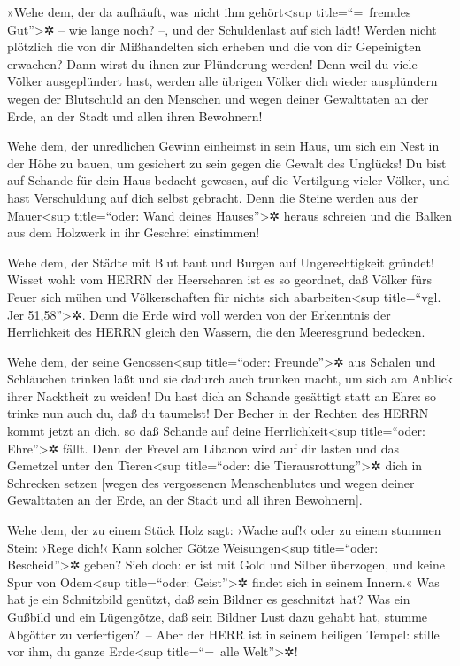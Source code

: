 »Wehe dem, der da aufhäuft, was nicht ihm gehört\textless sup
title=``=~fremdes Gut''\textgreater✲ -- wie lange noch? --, und der
Schuldenlast auf sich lädt!  Werden nicht plötzlich die
von dir Mißhandelten sich erheben und die von dir Gepeinigten erwachen?
Dann wirst du ihnen zur Plünderung werden!  Denn weil du
viele Völker ausgeplündert hast, werden alle übrigen Völker dich wieder
ausplündern wegen der Blutschuld an den Menschen und wegen deiner
Gewalttaten an der Erde, an der Stadt und allen ihren Bewohnern!

 Wehe dem, der unredlichen Gewinn einheimst in sein Haus,
um sich ein Nest in der Höhe zu bauen, um gesichert zu sein gegen die
Gewalt des Unglücks!  Du bist auf Schande für dein Haus
bedacht gewesen, auf die Vertilgung vieler Völker, und hast Verschuldung
auf dich selbst gebracht.  Denn die Steine werden aus der
Mauer\textless sup title=``oder: Wand deines Hauses''\textgreater✲
heraus schreien und die Balken aus dem Holzwerk in ihr Geschrei
einstimmen!

 Wehe dem, der Städte mit Blut baut und Burgen auf
Ungerechtigkeit gründet!  Wisset wohl: vom HERRN der
Heerscharen ist es so geordnet, daß Völker fürs Feuer sich mühen und
Völkerschaften für nichts sich abarbeiten\textless sup title=``vgl. Jer
51,58''\textgreater✲.  Denn die Erde wird voll werden von
der Erkenntnis der Herrlichkeit des HERRN gleich den Wassern, die den
Meeresgrund bedecken.

 Wehe dem, der seine Genossen\textless sup title=``oder:
Freunde''\textgreater✲ aus Schalen und Schläuchen trinken läßt und sie
dadurch auch trunken macht, um sich am Anblick ihrer Nacktheit zu
weiden!  Du hast dich an Schande gesättigt statt an Ehre:
so trinke nun auch du, daß du taumelst! Der Becher in der Rechten des
HERRN kommt jetzt an dich, so daß Schande auf deine
Herrlichkeit\textless sup title=``oder: Ehre''\textgreater✲ fällt.
 Denn der Frevel am Libanon wird auf dir lasten und das
Gemetzel unter den Tieren\textless sup title=``oder: die
Tierausrottung''\textgreater✲ dich in Schrecken setzen {[}wegen des
vergossenen Menschenblutes und wegen deiner Gewalttaten an der Erde, an
der Stadt und all ihren Bewohnern{]}.

 Wehe dem, der zu einem Stück Holz sagt: ›Wache auf!‹
oder zu einem stummen Stein: ›Rege dich!‹ Kann solcher Götze
Weisungen\textless sup title=``oder: Bescheid''\textgreater✲ geben? Sieh
doch: er ist mit Gold und Silber überzogen, und keine Spur von
Odem\textless sup title=``oder: Geist''\textgreater✲ findet sich in
seinem Innern.«  Was hat je ein Schnitzbild genützt, daß
sein Bildner es geschnitzt hat? Was ein Gußbild und ein Lügengötze, daß
sein Bildner Lust dazu gehabt hat, stumme Abgötter zu verfertigen?~--
 Aber der HERR ist in seinem heiligen Tempel: stille vor
ihm, du ganze Erde\textless sup title=``=~alle Welt''\textgreater✲!

